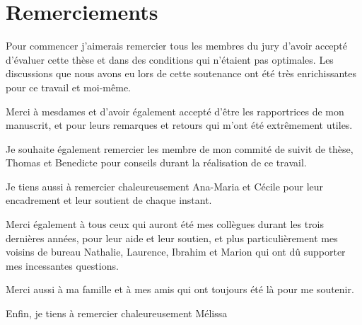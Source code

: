 \section*{Remerciements}

Pour commencer j'aimerais remercier tous les membres du jury d'avoir
accepté d'évaluer cette thèse et dans des conditions qui n'étaient pas
optimales. Les discussions que nous avons eu lors de cette soutenance
ont été très enrichissantes pour ce travail et moi-même.

Merci à mesdames  et  d'avoir
également accepté d'être les rapportrices de mon manuscrit, et pour
leurs remarques et retours qui m'ont été extrêmement utiles.

Je souhaite également remercier les membre de mon commité de suivit de
thèse, Thomas  et Benedicte  pour conseils
durant la réalisation de ce travail. 

Je tiens aussi à remercier chaleureusement Ana-Maria et Cécile pour
leur encadrement et leur soutient de chaque instant.

Merci également à tous ceux qui auront été mes collègues durant les
trois dernières années, pour leur aide et leur soutien, et plus
particulièrement mes voisins de bureau Nathalie, Laurence, Ibrahim et
Marion qui ont dû supporter mes incessantes questions.

Merci aussi à ma famille et à mes amis qui ont toujours été là pour me
soutenir.

Enfin, je tiens à remercier chaleureusement Mélissa